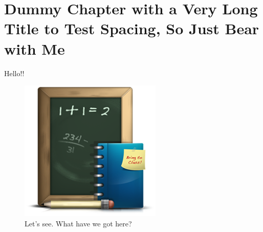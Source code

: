 
\chapter{Dummy Chapter with a Very Long Title to Test Spacing, So Just Bear with Me}

Hello!!

\begin{figure}[hbt!]
\centering
\includegraphics[width=.3\textwidth]{school}
\caption{Let's see. What have we got here?}
\end{figure}
